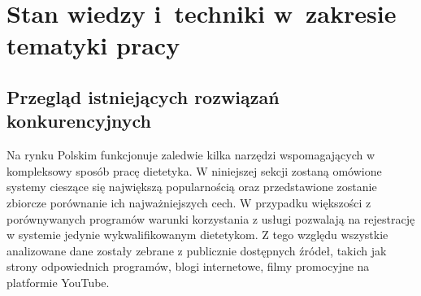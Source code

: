 \chapter{Stan wiedzy i~techniki w~zakresie tematyki pracy}\label{ch:knowladge-state}
\section{Przegląd istniejących rozwiązań konkurencyjnych}\label{sec:competitive-solutions}
Na rynku Polskim funkcjonuje zaledwie kilka narzędzi wspomagających w kompleksowy sposób pracę dietetyka.
W niniejszej sekcji zostaną omówione systemy cieszące się największą popularnością oraz przedstawione zostanie zbiorcze porównanie ich najważniejszych cech.
W przypadku większości z porównywanych programów warunki korzystania z usługi pozwalają na rejestrację w systemie jedynie wykwalifikowanym dietetykom.
Z tego względu wszystkie analizowane dane zostały zebrane z publicznie dostępnych źródeł, takich jak strony odpowiednich programów, blogi internetowe, filmy promocyjne na platformie YouTube\cite{url:youtube}.
